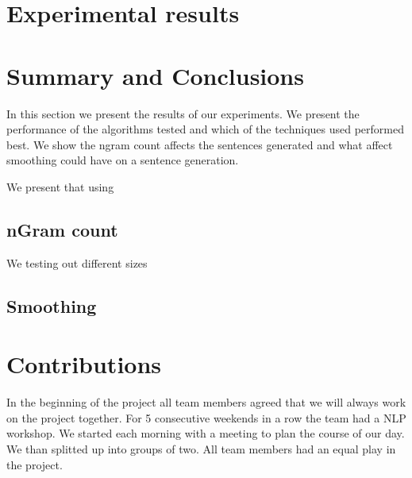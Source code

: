 \documentclass[a4paper,12pt]{article}
\begin{document}
\section{Experimental results}
\label{sec:exps}



\section{Summary and Conclusions}
\label{sec:summary}

In this section we present the results of our experiments. We present the performance of the algorithms tested and which of the techniques used performed best. We show the ngram count affects the sentences generated and what affect smoothing could have on a sentence generation.

We present that using

\subsection{nGram count}
We testing out different sizes 


\subsection{Smoothing}






\section{Contributions}
\label{sec:contributions}
In the beginning of the project all team members agreed that we will always work on the project together. For 5 consecutive weekends in a row the team had a NLP workshop. We started each morning with a meeting to plan  the course of our day. We than splitted up into groups of two. All team members had an equal play in the project. 

\clearpage


\end{document}

